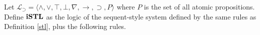 \begin{dfn}\label{istl}
	Let $\mathcal{L}_\supset=\langle \wedge, \vee, \top, \bot, \nabla, \rightarrow, \supset, P \rangle$ where $P$ is the set of all atomic propositions. Define $\istl$ as the logic of the sequent-style system defined by the same rules as Definition \ref{stl}, plus the following rules.
\end{dfn}
\begin{multicols}{2}
  \begin{prooftree}
  \end{prooftree}
  \columnbreak
  \begin{prooftree}
  \end{prooftree}
\end{multicols}